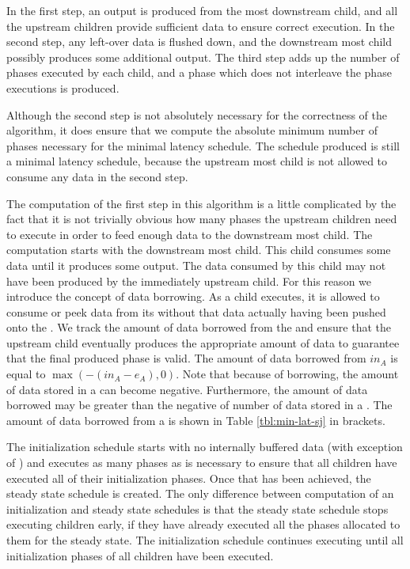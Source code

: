 In the first step, an output is produced from the most downstream
child, and all the upstream children provide sufficient data to
ensure correct execution. In the second step, any left-over data
is flushed down, and the downstream most child possibly produces
some additional output. The third step adds up the number of
phases executed by each child, and a phase which does not
interleave the phase executions is produced.

Although the second step is not absolutely necessary for the
correctness of the algorithm, it does ensure that we compute the
absolute minimum number of phases necessary for the minimal
latency schedule. The schedule produced is still a minimal latency
schedule, because the upstream most child is not allowed to
consume any data in the second step.

The computation of the first step in this algorithm is a little
complicated by the fact that it is not trivially obvious how many
phases the upstream children need to execute in order to feed
enough data to the downstream most child. The computation starts
with the downstream most child. This child consumes some data
until it produces some output. The data consumed by this child may
not have been produced by the immediately upstream child. For this
reason we introduce the concept of data borrowing. As a child
executes, it is allowed to consume or peek data from its {\Input}
{\Channel} without that data actually having been pushed onto the
{\Channel}. We track the amount of data borrowed from the
{\Channel} and ensure that the upstream child eventually produces
the appropriate amount of data to guarantee that the final
produced phase is valid. The amount of data borrowed from
{\Channel} $in_A$ is equal to $\max(-(in_A - e_A),0)$. Note that
because of borrowing, the amount of data stored in a {\Channel}
can become negative. Furthermore, the amount of data borrowed may
be greater than the negative of number of data stored in a
{\Channel}. The amount of data borrowed from a {\Channel} is shown
in Table \ref{tbl:min-lat-sj} in brackets.

The initialization schedule starts with no internally buffered
data (with exception of {\feedbackloops}) and executes as many
phases as is necessary to ensure that all children have executed
all of their initialization phases. Once that has been achieved,
the steady state schedule is created. The only difference between
computation of an initialization and steady state schedules is
that the steady state schedule stops executing children early, if
they have already executed all the phases allocated to them for
the steady state. The initialization schedule continues executing
until all initialization phases of all children have been
executed.

